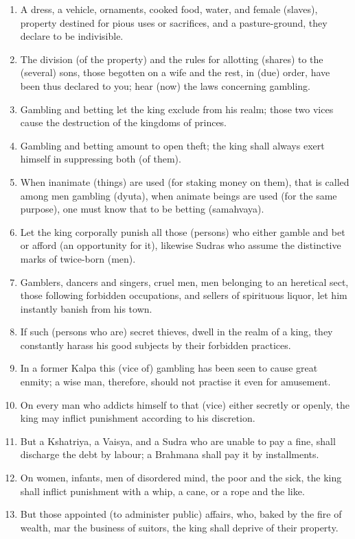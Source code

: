 \begin{enumerate}
\item A dress, a vehicle, ornaments, cooked food, water, and female (slaves), property destined for pious uses or sacrifices, and a pasture-ground, they declare to be indivisible.
\item The division (of the property) and the rules for allotting (shares) to the (several) sons, those begotten on a wife and the rest, in (due) order, have been thus declared to you; hear (now) the laws concerning gambling.
\item Gambling and betting let the king exclude from his realm; those two vices cause the destruction of the kingdoms of princes.
\item Gambling and betting amount to open theft; the king shall always exert himself in suppressing both (of them).
\item When inanimate (things) are used (for staking money on them), that is called among men gambling (dyuta), when animate beings are used (for the same purpose), one must know that to be betting (samahvaya).
\item Let the king corporally punish all those (persons) who either gamble and bet or afford (an opportunity for it), likewise Sudras who assume the distinctive marks of twice-born (men).
\item Gamblers, dancers and singers, cruel men, men belonging to an heretical sect, those following forbidden occupations, and sellers of spirituous liquor, let him instantly banish from his town.
\item If such (persons who are) secret thieves, dwell in the realm of a king, they constantly harass his good subjects by their forbidden practices.
\item In a former Kalpa this (vice of) gambling has been seen to cause great enmity; a wise man, therefore, should not practise it even for amusement.
\item On every man who addicts himself to that (vice) either secretly or openly, the king may inflict punishment according to his discretion.
\item But a Kshatriya, a Vaisya, and a Sudra who are unable to pay a fine, shall discharge the debt by labour; a Brahmana shall pay it by installments.
\item On women, infants, men of disordered mind, the poor and the sick, the king shall inflict punishment with a whip, a cane, or a rope and the like.
\item But those appointed (to administer public) affairs, who, baked by the fire of wealth, mar the business of suitors, the king shall deprive of their property.

\end{enumerate}
